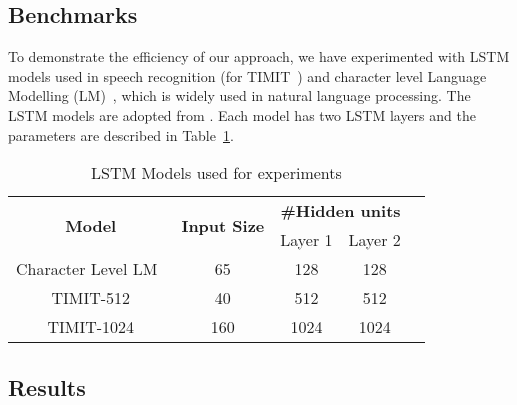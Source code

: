 {\subsection{Benchmarks}
To demonstrate the efficiency of our approach, we have experimented with LSTM models used in speech recognition (for TIMIT~\cite{garofolo1993timit}) and character level Language Modelling (LM)~\cite{sundermeyer2015feedforward}, which is widely used in natural language processing. The LSTM models are adopted from \cite{azari2020elsa,park2018maximizing,han2017ese}. Each model has two LSTM layers and the parameters are described in Table~\ref{tab:lstmModels}.
\begin{table}[]
	\caption{LSTM Models used for experiments}
	\label{tab:lstmModels}
	\centering
	\begin{tabular}{@{}ccccll@{}}
		\toprule
		\multirow{2}{*}{\textbf{Model}} & \multirow{2}{*}{\textbf{Input Size}} & \multicolumn{2}{c}{\textbf{\#Hidden units}} & \multicolumn{2}{l}{\multirow{5}{*}{}} \\ \cmidrule(lr){3-4}
		&                                      & Layer 1              & Layer 2              & \multicolumn{2}{l}{}                  \\ \cmidrule(r){1-4}
		Character Level LM~\cite{azari2020elsa}                              & 65                                   & 128                  & 128                  & \multicolumn{2}{l}{}                  \\ \cmidrule(r){1-4}
		TIMIT-512 \cite{park2018maximizing}                      & 40                                   & 512                  & 512                  & \multicolumn{2}{l}{}                  \\ \cmidrule(r){1-4}
		TIMIT-1024 \cite{han2017ese}                     & 160                                  & 1024                 & 1024                 & \multicolumn{2}{l}{}                  \\ \bottomrule
	\end{tabular}
\end{table}
\subsection{Results}
}
